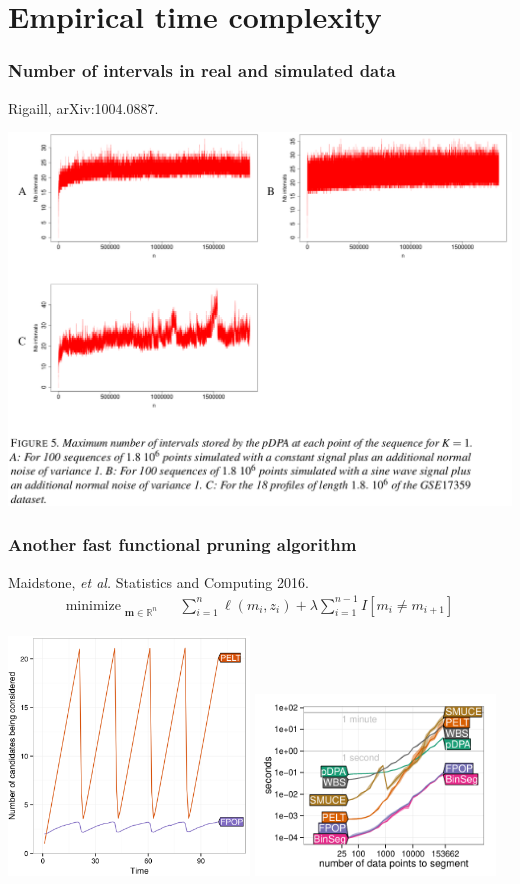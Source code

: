 \documentclass{beamer}
\DeclareMathOperator*{\minimize}{minimize}
\newcommand{\RR}{\mathbb R}
\begin{document}
\section{Empirical time complexity}

\begin{frame}
  \frametitle{Number of intervals in real and simulated data}
  Rigaill, arXiv:1004.0887.

  \includegraphics[width=\textwidth]{screenshot-figure-5}
\end{frame}

\begin{frame}
  \frametitle{Another fast functional pruning algorithm}
  Maidstone, {\it et al.} Statistics and Computing 2016.
\vskip -0.5cm
\begin{align*}
    \minimize_{\substack{
  \mathbf m\in\RR^{n}
  }} &\ \ 
    \sum_{i=1}^n \ell( m_i,  z_i)  + \lambda{\sum_{i=1}^{n-1}I[m_{i}\neq m_{i+1}]}
  \nonumber 
\end{align*}

\centering
  \includegraphics[width=0.48\textwidth]{screenshot-Maidstone-figure-4}
\includegraphics[width=0.48\textwidth]{figure-systemtime-arrays-bins}
  
\end{frame}
\end{document}
